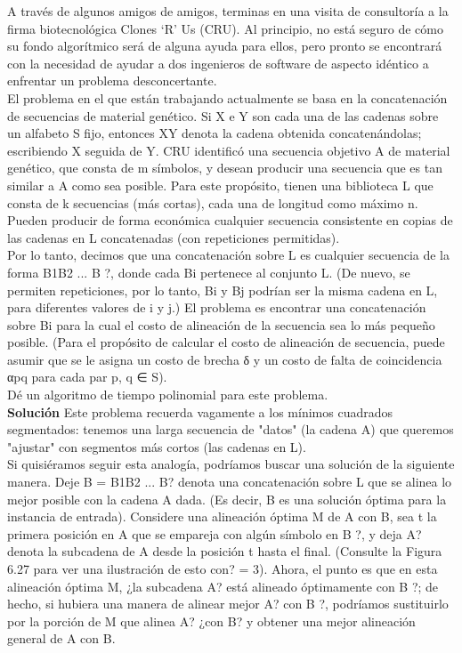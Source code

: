 \documentclass[a4paper]{article}
\begin{document}
A través de algunos amigos de amigos, terminas en una visita de consultoría a la firma biotecnológica Clones ‘R’ Us (CRU). Al principio, no está seguro de cómo su fondo algorítmico será de alguna ayuda para ellos, pero pronto se encontrará con la necesidad de ayudar a dos ingenieros de software de aspecto idéntico a enfrentar un problema desconcertante.\\

El problema en el que están trabajando actualmente se basa en la concatenación de secuencias de material genético. Si X e Y son cada una de las cadenas sobre un alfabeto S fijo, entonces XY denota la cadena obtenida concatenándolas; escribiendo X seguida de Y. CRU identificó una secuencia objetivo A de material genético, que consta de m símbolos, y desean producir una secuencia que es tan similar a A como sea posible. Para este propósito, tienen una biblioteca L que consta de k secuencias (más cortas), cada una de longitud como máximo n. Pueden producir de forma económica cualquier secuencia consistente en copias de las cadenas en L concatenadas (con repeticiones permitidas).\\

Por lo tanto, decimos que una concatenación sobre L es cualquier secuencia de la forma B1B2 ... B ?, donde cada Bi pertenece al conjunto L. (De nuevo, se permiten repeticiones, por lo tanto, Bi y Bj podrían ser la misma cadena en L, para diferentes valores de i y j.) El problema es encontrar una concatenación sobre {Bi} para la cual el costo de alineación de la secuencia sea lo más pequeño posible. (Para el propósito de calcular el costo de alineación de secuencia, puede asumir que se le asigna un costo de brecha δ y un costo de falta de coincidencia αpq para cada par p, q ∈ S).\\

Dé un algoritmo de tiempo polinomial para este problema.\\

\textbf{Solución} Este problema recuerda vagamente a los mínimos cuadrados segmentados: tenemos una larga secuencia de "datos" (la cadena A) que queremos "ajustar" con segmentos más cortos (las cadenas en L).\\

Si quisiéramos seguir esta analogía, podríamos buscar una solución de la siguiente manera. Deje B = B1B2 ... B? denota una concatenación sobre L que se alinea lo mejor posible con la cadena A dada. (Es decir, B es una solución óptima para la instancia de entrada). Considere una alineación óptima M de A con B, sea t la primera posición en A que se empareja con algún símbolo en B ?, y deja A? denota la subcadena de A desde la posición t hasta el final. (Consulte la Figura 6.27 para ver una ilustración de esto con? = 3). Ahora, el punto es que en esta alineación óptima M, ¿la subcadena A? está alineado óptimamente con B ?; de hecho, si hubiera una manera de alinear mejor A? con B ?, podríamos sustituirlo por la porción de M que alinea A? ¿con B? y obtener una mejor alineación general de A con B.\\
\end{document}
